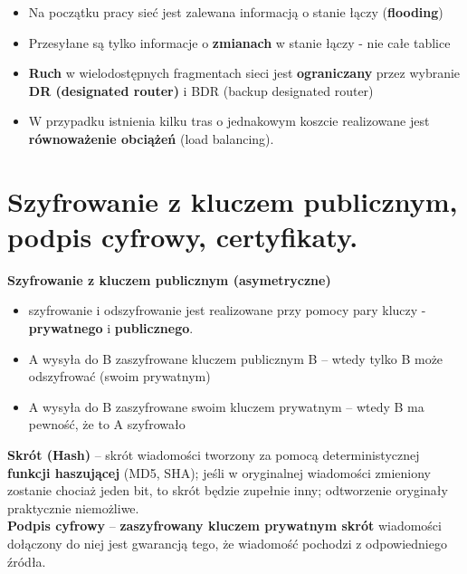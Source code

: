\documentclass[main.tex]{subfiles}
\begin{document}
\begin{itemize}[noitemsep]
        \item Na początku pracy sieć jest zalewana informacją o stanie łączy (\textbf{flooding})

        \item Przesyłane są tylko informacje o \textbf{zmianach} w stanie łączy - nie całe tablice

        \item \textbf{Ruch} w wielodostępnych fragmentach sieci jest \textbf{ograniczany} przez wybranie \textbf{DR (designated router)} i
        BDR (backup designated router)

        \item W przypadku istnienia kilku tras o jednakowym koszcie realizowane jest \textbf{równoważenie obciążeń}
        (load balancing).
    \end{itemize}


    \section{Szyfrowanie z kluczem publicznym, podpis cyfrowy, certyfikaty.}

    \textbf{Szyfrowanie z kluczem publicznym (asymetryczne)}
    \begin{itemize}[noitemsep]
        \item szyfrowanie i odszyfrowanie jest realizowane przy pomocy pary kluczy - \textbf{prywatnego} i \textbf{publicznego}.
        \item A wysyła do B zaszyfrowane kluczem publicznym B -- wtedy tylko B może odszyfrować (swoim prywatnym)
        \item A wysyła do B zaszyfrowane swoim kluczem prywatnym -- wtedy B ma pewność, że to A szyfrowało
    \end{itemize}

    \noindent \textbf{Skrót (Hash)} -- skrót wiadomości tworzony za pomocą deterministycznej \textbf{funkcji haszującej}
    (MD5, SHA); jeśli w oryginalnej wiadomości zmieniony zostanie chociaż jeden bit, to skrót będzie zupełnie inny;
    odtworzenie oryginały praktycznie niemożliwe.\\

    \noindent \textbf{Podpis cyfrowy} -- \textbf{zaszyfrowany kluczem prywatnym skrót} wiadomości dołączony do niej jest
    gwarancją tego, że wiadomość pochodzi z odpowiedniego źródła.\\
\end{document}
